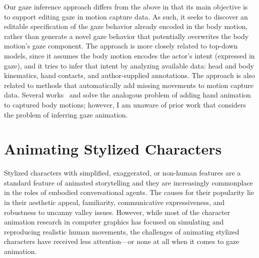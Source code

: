 Our gaze inference approach differs from the above in that its main objective is to support editing gaze in motion capture data. As such, it seeks to discover an editable specification of the gaze behavior already encoded in the body motion, rather than generate a novel gaze behavior that potentially overwrites the body motion's gaze component. The approach is more closely related to top-down models, since it assumes the body motion encodes the actor's intent (expressed in gaze), and it tries to infer that intent by analyzing available data: head and body kinematics, hand contacts, and author-supplied annotations.
The approach is also related to methods that automatically add missing movements to motion capture data. Several works~\citep{jorg2012finger} and \citep{ye2012hand} solve the analogous problem of adding hand animation to captured body motions; however, I am unaware of prior work that considers the problem of inferring gaze animation.

\section{Animating Stylized Characters}
\label{sec:AnimatingStylizedCharacters}

Stylized characters with simplified, exaggerated, or non-human features are a standard feature of animated storytelling and they are increasingly commonplace in the roles of embodied conversational agents. The causes for their popularity lie in their aesthetic appeal, familiarity, communicative expressiveness, and robustness to uncanny valley issues. However, while most of the character animation research in computer graphics has focused on simulating and reproducing realistic human movements, the challenges of animating stylized characters have received less attention---or none at all when it comes to gaze animation.


